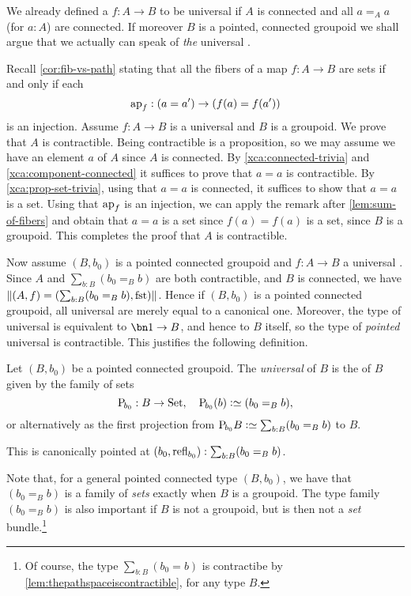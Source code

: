 We already defined a \covering $f:A\to B$ to be universal if $A$ is connected
and all $a=_A a$ (for $a:A$) are connected.
If moreover $B$ is a pointed, connected groupoid we shall argue that
we actually can speak of \emph{the} universal \covering.

Recall \cref{cor:fib-vs-path} stating that all the fibers of a map $f:A\to B$
are sets if and only if each
\[
\ap{f}: (a=a')\to (f(a)=f(a'))
\]
is an injection.
Assume $f:A\to B$ is a universal \covering and $B$ is a groupoid.
We prove that $A$ is contractible.
Being contractible is a proposition, so we may assume
we have an element $a$ of $A$ since $A$ is connected.
By \cref{xca:connected-trivia} and \ref{xca:component-connected}
it suffices to prove that $a=a$ is contractible.
By \cref{xca:prop-set-trivia}, using that $a=a$ is connected,
it suffices to show that $a=a$ is a set.
Using that $\ap{f}$ is an injection, we can apply the remark after
\cref{lem:sum-of-fibers} and obtain that $a=a$ is a set since
$f(a)=f(a)$ is a set, since $B$ is a groupoid.
This completes the proof that $A$ is contractible.

Now assume $(B,b_0)$ is a pointed connected groupoid and $f:A\to B$
a universal \covering. Since $A$ and $\sum_{b:B}(b_0=_Bb)$ are both
contractible, and $B$ is connected, we have
$\Trunc{(A,f)=(\sum_{b:B}(b_0=_Bb),\fst)}$.
Hence if $(B,b_0)$ is a pointed connected groupoid, all
universal \coverings are merely equal to a canonical one.
Moreover, the type of universal \coverings is equivalent to
$\bn 1 \to B$, and hence to $B$ itself,
so the type of \emph{pointed} universal \coverings is contractible.
This justifies the following definition.
\begin{definition}
  \label{def:universalcover}
  Let $(B,b_0)$ be a pointed connected groupoid.
  The \emph{universal \covering} of $B$
  is the \covering of $B$ given by the family of sets
  \[
    \uc{b_0}:B\to\Set,\quad \uc{b_0}(b)\defequi (b_0=_Bb),
  \]
  or alternatively as the first projection from
  $\uc{b_0}B\defequi\sum_{b:B}(b_0=_Bb)$ to $B$.

  This is canonically pointed at $(b_0,\mathrm{refl}_{b_0}) : \sum_{b:B}(b_0=_Bb)$.
\end{definition}
Note that, for a general pointed connected type $(B,b_0)$, we have that
$(b_0=_B b)$ is a family of \emph{sets} exactly when $B$ is a groupoid.
The type family $(b_0=_B b)$ is also important if $B$ is not a groupoid,
but is then not a \emph{set} bundle.\footnote{%
  Of course, the type $\sum_{b:B}(b_0=b)$ is contractibe
  by \cref{lem:thepathspaceiscontractible}, for any type $B$.}

